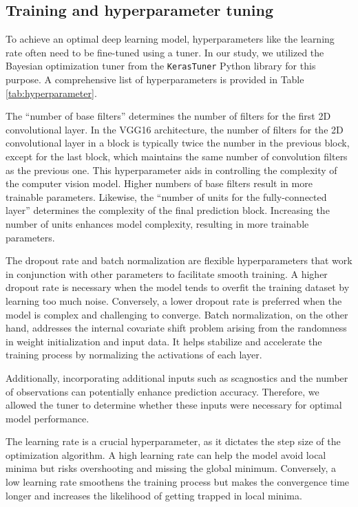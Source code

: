 \documentclass[]{interact}
\theoremstyle{plain}%
\theoremstyle{definition}
\theoremstyle{remark}
\begin{document}
\subsection{Training and hyperparameter
tuning}\label{training-and-hyperparameter-tuning}

To achieve an optimal deep learning model, hyperparameters like the
learning rate often need to be fine-tuned using a tuner. In our study,
we utilized the Bayesian optimization tuner from the \texttt{KerasTuner}
Python library \citep{omalley2019kerastuner} for this purpose. A
comprehensive list of hyperparameters is provided in Table
\ref{tab:hyperparameter}.

The ``number of base filters'' determines the number of filters for the
first 2D convolutional layer. In the VGG16 architecture, the number of
filters for the 2D convolutional layer in a block is typically twice the
number in the previous block, except for the last block, which maintains
the same number of convolution filters as the previous one. This
hyperparameter aids in controlling the complexity of the computer vision
model. Higher numbers of base filters result in more trainable
parameters. Likewise, the ``number of units for the fully-connected
layer'' determines the complexity of the final prediction block.
Increasing the number of units enhances model complexity, resulting in
more trainable parameters.

The dropout rate and batch normalization are flexible hyperparameters
that work in conjunction with other parameters to facilitate smooth
training. A higher dropout rate is necessary when the model tends to
overfit the training dataset by learning too much noise. Conversely, a
lower dropout rate is preferred when the model is complex and
challenging to converge. Batch normalization, on the other hand,
addresses the internal covariate shift problem arising from the
randomness in weight initialization and input data. It helps stabilize
and accelerate the training process by normalizing the activations of
each layer.

Additionally, incorporating additional inputs such as scagnostics and
the number of observations can potentially enhance prediction accuracy.
Therefore, we allowed the tuner to determine whether these inputs were
necessary for optimal model performance.

The learning rate is a crucial hyperparameter, as it dictates the step
size of the optimization algorithm. A high learning rate can help the
model avoid local minima but risks overshooting and missing the global
minimum. Conversely, a low learning rate smoothens the training process
but makes the convergence time longer and increases the likelihood of
getting trapped in local minima.
\end{document}
